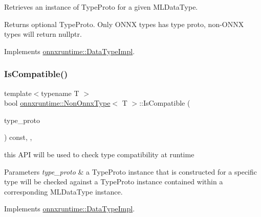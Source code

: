 Retrieves an instance of Type\+Proto for a given M\+L\+Data\+Type. 

\begin{DoxyReturn}{Returns}
optional Type\+Proto. Only O\+N\+NX types has type proto, non-\/\+O\+N\+NX types will return nullptr. 
\end{DoxyReturn}


Implements \mbox{\hyperlink{classonnxruntime_1_1DataTypeImpl_a9bea0ebb8f0d94ed5a1b541c160fa33a}{onnxruntime\+::\+Data\+Type\+Impl}}.

\mbox{\label{classonnxruntime_1_1NonOnnxType_a85fcf77182e033f38fe91c8845bb5aec}} 
\subsubsection{\texorpdfstring{Is\+Compatible()}{IsCompatible()}}
{\footnotesize\ttfamily template$<$typename T $>$ \\
bool \mbox{\hyperlink{classonnxruntime_1_1NonOnnxType}{onnxruntime\+::\+Non\+Onnx\+Type}}$<$ T $>$\+::Is\+Compatible (\begin{DoxyParamCaption}\item[{const O\+N\+N\+X\+\_\+\+N\+A\+M\+E\+S\+P\+A\+C\+E\+::\+Type\+Proto \&}]{type\+\_\+proto }\end{DoxyParamCaption}) const\hspace{0.3cm}{\ttfamily [inline]}, {\ttfamily [override]}, {\ttfamily [virtual]}}



this A\+PI will be used to check type compatibility at runtime 


\begin{DoxyParams}{Parameters}
{\em type\+\_\+proto} & a Type\+Proto instance that is constructed for a specific type will be checked against a Type\+Proto instance contained within a corresponding M\+L\+Data\+Type instance. \\
\hline
\end{DoxyParams}


Implements \mbox{\hyperlink{classonnxruntime_1_1DataTypeImpl_a94b2c274bd74068291356c81515d69a1}{onnxruntime\+::\+Data\+Type\+Impl}}.

\mbox{\label{classonnxruntime_1_1NonOnnxType_a563b71919e9400bb66cee0702d98b232}} 
